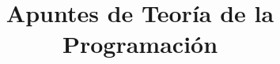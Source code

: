 \documentclass{report}
\theoremstyle{definition}
\theoremstyle{remark}
\theoremstyle{jeje}
\numberwithin{section}{chapter}
\numberwithin{equation}{chapter}
\begin{document}
\title{Apuntes de Teoría de la Programación}


\author{}

\maketitle




\cleardoublepage
\vspace*{13.5pc}
\begin{center}
\end{center}
\cleardoublepage

\renewcommand{\contentsname}{Contenidos}
\tableofcontents
{}









\appendix



\printindex
\end{document}
